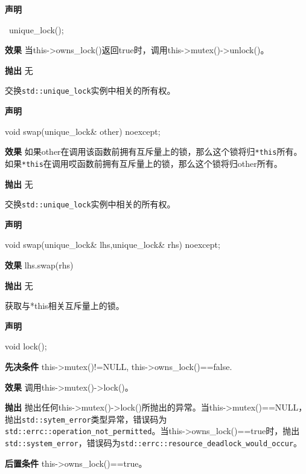 \textbf{声明}

\begin{cpp}
~unique_lock();
\end{cpp}

\textbf{效果}
当this->owns\_lock()返回true时，调用this->mutex()->unlock()。

\textbf{抛出}
无


交换\texttt{std::unique\_lock}实例中相关的所有权。

\textbf{声明}

\begin{cpp}
void swap(unique_lock& other) noexcept;
\end{cpp}

\textbf{效果}
如果other在调用该函数前拥有互斥量上的锁，那么这个锁将归\texttt{*this}所有。如果\texttt{*this}在调用哎函数前拥有互斥量上的锁，那么这个锁将归other所有。

\textbf{抛出}
无


交换\texttt{std::unique\_lock}实例中相关的所有权。

\textbf{声明}

\begin{cpp}
void swap(unique_lock& lhs,unique_lock& rhs) noexcept;
\end{cpp}

\textbf{效果}
lhs.swap(rhs)

\textbf{抛出}
无


获取与*this相关互斥量上的锁。

\textbf{声明}

\begin{cpp}
void lock();
\end{cpp}

\textbf{先决条件}
this->mutex()!=NULL, this->owns\_lock()==false.

\textbf{效果}
调用this->mutex()->lock()。

\textbf{抛出}
抛出任何this->mutex()->lock()所抛出的异常。当this->mutex()==NULL，抛出\texttt{std::sytem\_error}类型异常，错误码为\texttt{std::errc::operation\_not\_permitted}。当this->owns\_lock()==true时，抛出\texttt{std::system\_error}，错误码为\texttt{std::errc::resource\_deadlock\_would\_occur}。

\textbf{后置条件}
this->owns\_lock()==true。


